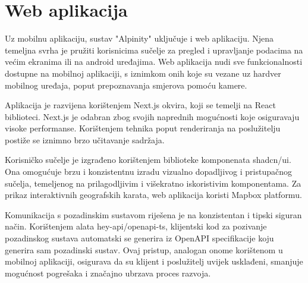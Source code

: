 \section{Web aplikacija}

Uz mobilnu aplikaciju, sustav "Alpinity" uključuje i web aplikaciju. Njena temeljna svrha je pružiti korisnicima sučelje za pregled i upravljanje podacima na većim ekranima ili na android uređajima. Web aplikacija nudi sve funkcionalnosti dostupne na mobilnoj aplikaciji, s iznimkom onih koje su vezane uz hardver mobilnog uređaja, poput prepoznavanja smjerova pomoću kamere.

Aplikacija je razvijena korištenjem Next.js okvira, koji se temelji na React biblioteci. Next.js je odabran zbog svojih naprednih mogućnosti koje osiguravaju visoke performanse. Korištenjem tehnika poput renderiranja na poslužitelju postiže se iznimno brzo učitavanje sadržaja.

Korisničko sučelje je izgrađeno korištenjem biblioteke komponenata shadcn/ui. Ona omogućuje brzu i konzistentnu izradu vizualno dopadljivog i pristupačnog sučelja, temeljenog na prilagodljivim i višekratno iskoristivim komponentama. Za prikaz interaktivnih geografskih karata, web aplikacija koristi Mapbox platformu.

Komunikacija s pozadinskim sustavom riješena je na konzistentan i tipski siguran način. Korištenjem alata hey-api/openapi-ts, klijentski kod za pozivanje pozadinskog sustava automatski se generira iz OpenAPI specifikacije koju generira sam pozadinski sustav. Ovaj pristup, analogan onome korištenom u mobilnoj aplikaciji, osigurava da su klijent i poslužitelj uvijek usklađeni, smanjuje mogućnost pogrešaka i značajno ubrzava proces razvoja.